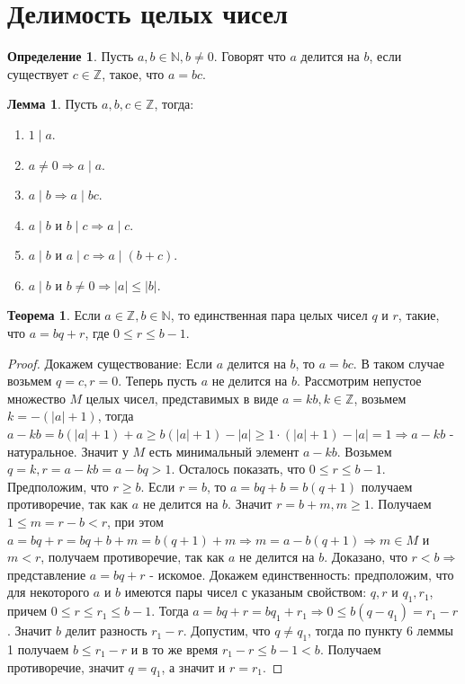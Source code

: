 \documentclass[a4paper, 12pt]{article}
\theoremstyle{definition}
\newtheorem{definition}{Определение}[section]
\newtheorem{theorem}{Теорема}[section]
\newtheorem{lemma}{Лемма}[section]
\newtheorem*{comment}{Замечание}
\begin{document}
    \section{Делимость целых чисел}
    \begin{definition}
        Пусть $a,b\in \mathbb{N}, b\ne 0$. Говорят что $a$ делится на $b$, если существует $c\in \mathbb{Z}$, такое, что $a=bc$.
    \end{definition}
    \begin{comment}
        $a$ называется делимым, а $b$ называется делителем числа $a$. Запись $b \mid a$ означает, что $b$ делит $a$. Если $b$ не делит $a$, то пишут $b\nmid a$.
    \end{comment}
    \begin{lemma}
        Пусть $a,b,c \in \mathbb{Z}$, тогда:
        \begin{enumerate}
            \item $1 \mid a$.
            \item $a\ne 0 \Rightarrow a\mid a$.
            \item $a\mid b \Rightarrow a\mid bc$.
            \item $a\mid b$ и $b\mid c \Rightarrow a\mid c$.
            \item $a\mid b$ и $a\mid c \Rightarrow a\mid (b+c)$.
            \item $a\mid b$ и $b\ne 0 \Rightarrow |a|\leq|b|$.
        \end{enumerate}
    \end{lemma}
    \begin{theorem}
        Если $a\in \mathbb{Z}, b\in \mathbb{N}$, то  единственная пара целых чисел $q$ и $r$, такие, что $a=bq+r$, где $0\leq r\leq b-1$. 
    \end{theorem}
    \begin{proof}
        Докажем существование: Если $a$ делится на $b$, то $a=bc$. В таком случае возьмем $q=c, r=0$. Теперь пусть $a$ не делится на $b$. Рассмотрим непустое множество $M$ целых чисел, представимых в виде $a=kb, k\in \mathbb{Z}$, возьмем $k=-(|a|+1)$, тогда $a-kb=b(|a|+1)+a\geq b(|a|+1)-|a|\geq 1\cdot (|a|+1)-|a|=1 \Rightarrow a-kb$ - натуральное. Значит у $M$ есть минимальный элемент $a-kb$. Возьмем $q=k, r=a-kb=a-bq > 1$. Осталось показать, что $0\leq r\leq b-1$. Предположим, что $r\geq b$. Если $r=b$, то $a=bq+b=b(q+1)$ получаем противоречие, так как $a$ не делится на $b$. Значит $r=b+m, m\geq 1$. Получаем $1\leq m=r-b<r$, при этом $a=bq+r=bq+b+m=b(q+1)+m \Rightarrow m=a-b(q+1) \Rightarrow m\in M$ и $m<r$, получаем противоречие, так как $a$ не делится на $b$. Доказано, что $r<b \Rightarrow$ представление $a=bq+r$ - искомое. Докажем единственность: предположим, что для некоторого $a$ и $b$ имеются пары чисел с указаным свойством: $q,r$ и $q_1,r_1$, причем $0\leq r\leq r_1 \leq b-1$. Тогда $a=bq+r=bq_1+r_1\Rightarrow 0\leq b(q-q_1)=r_1-r$. Значит $b$ делит разность $r_1-r$. Допустим, что $q\ne q_1$, тогда по пункту 6 леммы 1 получаем $b\leq r_1-r$ и в то же время $r_1-r\leq b-1<b$. Получаем противоречие, значит $q=q_1$, а значит и $r=r_1$.
    \end{proof}
\end{document}
